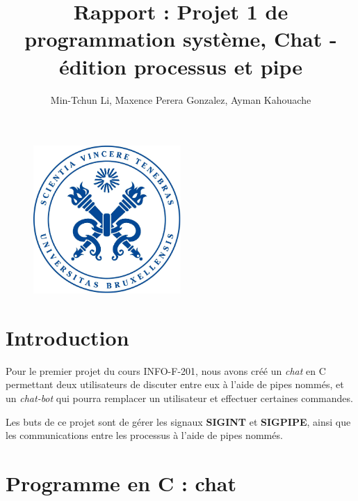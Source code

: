 \documentclass[utf8]{article}
\title{Rapport : Projet 1 de programmation système, Chat - édition processus et pipe}
\author{Min-Tchun Li, Maxence Perera Gonzalez, Ayman Kahouache}
\date{}
\begin{document}
\maketitle
\begin{figure}[H]
	\centering
	\includegraphics[width=0.5\textwidth]{logo.png}
	\label{fig:logo}
\end{figure}

\newpage
\tableofcontents
\newpage

\section{Introduction}
Pour le premier projet du cours INFO-F-201, nous avons créé un \textit{chat} en C permettant deux utilisateurs de discuter entre eux à l'aide de pipes nommés, et un \textit{chat-bot} qui pourra remplacer un utilisateur et effectuer certaines commandes.

Les buts de ce projet sont de gérer les signaux \textbf{SIGINT} et \textbf{SIGPIPE}, ainsi que les communications entre les processus à l'aide de pipes nommés.

\section{Programme en C : chat}
\end{document}
